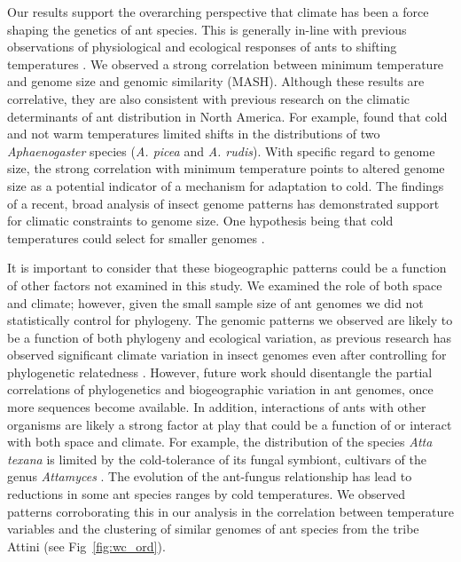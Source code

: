 \documentclass[fleqn,10pt,lineno]{wlpeerj} %
\begin{document}
Our results support the overarching perspective that climate has been
a force shaping the genetics of ant species. This is generally in-line
with previous observations of physiological and ecological responses
of ants to shifting temperatures \citep{Warren2013, Stanton-Geddes,
  Diamond2016, Nguyen2017, HelmsCahan2017, Diamond2017,
  Penick2017}. We observed a strong correlation between minimum
temperature and genome size and genomic similarity (MASH). Although
these results are correlative, they are also consistent with previous
research on the climatic determinants of ant distribution in North
America. For example, \citep{Warren2013} found that cold and not warm
temperatures limited shifts in the distributions of two
\textit{Aphaenogaster} species (\textit{A. picea} and
\textit{A. rudis}). With specific regard to genome size, the strong
correlation with minimum temperature points to altered genome size as
a potential indicator of a mechanism for adaptation to cold. The
findings of a recent, broad analysis of insect genome patterns
\citep{Alfsnes2017} has demonstrated support for climatic constraints
to genome size. One hypothesis being that cold temperatures could
select for smaller genomes \citep{Mousseau1997, Petrov2001,
  Alfsnes2017}.

It is important to consider that these biogeographic patterns could be
a function of other factors not examined in this study. We examined
the role of both space and climate; however, given the small sample
size of ant genomes we did not statistically control for
phylogeny. The genomic patterns we observed are likely to be a
function of both phylogeny and ecological variation, as previous
research has observed significant climate variation in insect genomes
even after controlling for phylogenetic relatedness
\citep{Alfsnes2017}. However, future work should disentangle the
partial correlations of phylogenetics and biogeographic variation in
ant genomes, once more sequences become available. In addition,
interactions of ants with other organisms are likely a strong factor
at play that could be a function of or interact with both space and
climate. For example, the distribution of the species \textit{Atta
  texana} is limited by the cold-tolerance of its fungal symbiont,
cultivars of the genus \textit{Attamyces} \citep{Mueller2011}. The
evolution of the ant-fungus relationship has lead to reductions in
some ant species ranges by cold temperatures. We observed patterns
corroborating this in our analysis in the correlation between
temperature variables and the clustering of similar genomes of ant
species from the tribe Attini (see Fig~\ref{fig:wc_ord}).
\end{document}
